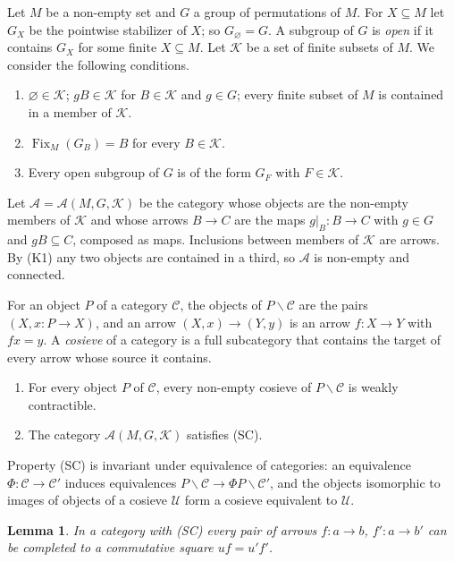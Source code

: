 \documentclass[11pt,a4paper]{article}
\newtheorem{lemma}[theorem]{Lemma}
\theoremstyle{definition}
\newcommand{\Fix}{\operatorname{Fix}}
\newcommand{\K}{\mathcal{K}}
\begin{document}
Let $M$ be a non-empty set and $G$ a group of permutations of $M$. For
$X\subseteq M$ let $G_X$ be the pointwise stabilizer of $X$; so
$G_\varnothing=G$. A subgroup of $G$ is \emph{open} if it contains $G_X$ for
some finite $X\subseteq M$. Let $\K$ be a set of finite subsets of $M$. We
consider the following conditions.
\begin{enumerate}
\item[\textup{(K1)}] $\varnothing\in\K$; $gB\in\K$ for $B\in\K$ and $g\in G$; every
 finite subset of $M$ is contained in a member of $\K$.
\item[\textup{(K2)}] $\Fix_M(G_B)=B$ for every $B\in\K$.
\item[\textup{(K3)}] Every open subgroup of $G$ is of the form $G_F$ with $F\in\K$.
\end{enumerate}
Let $\mathcal A=\mathcal A(M,G,\K)$ be the category whose objects are the
non-empty members of $\K$ and whose arrows $B\to C$ are the maps
$g|_B\colon B\to C$ with $g\in G$ and $gB\subseteq C$, composed as maps.
Inclusions between members of $\K$ are arrows. By (K1) any two objects are
contained in a third, so $\mathcal A$ is non-empty and connected.

For an object $P$ of a category $\mathcal C$, the objects of
$P\backslash\mathcal C$ are the pairs $(X,x\colon P\to X)$, and an arrow
$(X,x)\to(Y,y)$ is an arrow $f\colon X\to Y$ with $fx=y$. A \emph{cosieve} of a
category is a full subcategory that contains the target of every arrow whose
source it contains.
\begin{enumerate}
\item[\textup{(SC)}] For every object $P$ of $\mathcal C$, every non-empty cosieve
 of $P\backslash\mathcal C$ is weakly contractible.
\item[\textup{(K4)}] The category $\mathcal A(M,G,\K)$ satisfies \textup{(SC)}.
\end{enumerate}
Property (SC) is invariant under equivalence of categories: an equivalence
$\Phi\colon\mathcal C\to\mathcal C'$ induces equivalences
$P\backslash\mathcal C\to\Phi P\backslash\mathcal C'$, and the objects
isomorphic to images of objects of a cosieve $\mathcal U$ form a cosieve
equivalent to $\mathcal U$.

\begin{lemma}\label{lem:squares}
In a category with \textup{(SC)} every pair of arrows $f\colon a\to b$,
$f'\colon a\to b'$ can be completed to a commutative square $uf=u'f'$.
\end{lemma}
\end{document}
